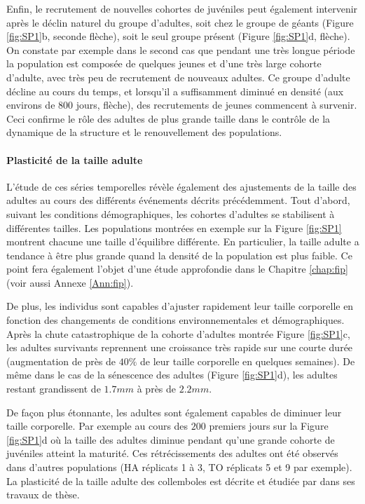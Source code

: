 Enfin, le recrutement de nouvelles cohortes de juvéniles peut également
intervenir après le déclin naturel du groupe d'adultes, soit chez le groupe de
géants (Figure \ref{fig:SP1}b, seconde flèche), soit le seul groupe présent
(Figure \ref{fig:SP1}d, flèche). On constate par exemple dans le second cas que
pendant une très longue période la population est composée de quelques jeunes et
d'une très large cohorte d'adulte, avec très peu de recrutement de nouveaux
adultes. Ce groupe d'adulte décline au cours du temps, et lorsqu'il a
suffisamment diminué en densité (aux environs de $800$ jours, flèche), des
recrutements de jeunes commencent à survenir. Ceci confirme le rôle des
adultes de plus grande taille dans le contrôle de la dynamique de la structure
et le renouvellement des populations. 

\paragraph{Plasticité de la taille adulte}

L'étude de ces séries temporelles révèle également des ajustements de la taille
des adultes au cours des différents événements décrits précédemment. Tout
d'abord, suivant les conditions démographiques, les cohortes d'adultes se
stabilisent à différentes tailles. Les populations montrées en exemple sur la
Figure \ref{fig:SP1} montrent chacune une taille d'équilibre différente. En
particulier, la taille adulte a tendance à être plus grande quand la densité
de la population est plus faible. Ce point fera également l'objet d'une étude
approfondie dans le Chapitre \ref{chap:fip} (voir aussi Annexe \ref{Ann:fip}).

De plus, les individus sont capables d'ajuster rapidement leur taille corporelle
en fonction des changements de conditions environnementales et démographiques.
Après la chute catastrophique de la cohorte d'adultes montrée Figure
\ref{fig:SP1}c, les adultes survivants reprennent une croissance très rapide sur
une courte durée (augmentation de près de $40\%$ de leur taille corporelle en
quelques semaines).
De même dans le cas de la sénescence des adultes (Figure \ref{fig:SP1}d), les
adultes restant grandissent de $1.7mm$ à près de $2.2mm$.

De façon plus étonnante, les adultes sont également capables de diminuer leur
taille corporelle. Par exemple au cours des $200$ premiers jours sur la Figure
\ref{fig:SP1}d où la taille des adultes diminue pendant qu'une grande cohorte de
juvéniles atteint la maturité. Ces rétrécissements des adultes ont été observés
dans d'autres populations (HA réplicats 1 à 3, TO réplicats 5 et 9 par exemple).
La plasticité de la taille adulte des collemboles est décrite et étudiée par
\textcites{mallard2013b} dans ses travaux de thèse.

